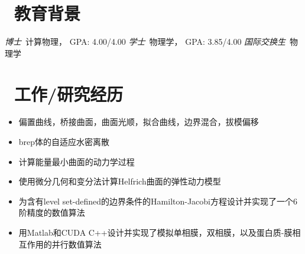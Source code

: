 \documentclass{resume}
\begin{document}


 
\section{\faGraduationCap\  教育背景}
\textit{博士}\ 计算物理， GPA: 4.00/4.00
\textit{学士}\ 物理学， GPA: 3.85/4.00
\textit{国际交换生}\ 物理学

\section{\faFlask\ 工作/研究经历}
\begin{onehalfspacing}
\begin{itemize}
  \item 偏置曲线，桥接曲面，曲面光顺，拟合曲线，边界混合，拔模偏移
\end{itemize}
\end{onehalfspacing}


\begin{onehalfspacing}
\begin{itemize}
  \item brep体的自适应水密离散
\end{itemize}
\end{onehalfspacing}



\begin{onehalfspacing}

\begin{itemize}
  \item 计算能量最小曲面的动力学过程
  \item 使用微分几何和变分法计算Helfrich曲面的弹性动力模型
  \item 为含有level set-defined的边界条件的Hamilton-Jacobi方程设计并实现了一个6阶精度的数值算法
  \item 用Matlab和CUDA C++设计并实现了模拟单相膜，双相膜，以及蛋白质-膜相互作用的并行数值算法
\end{itemize}
\end{onehalfspacing}
\end{document}
